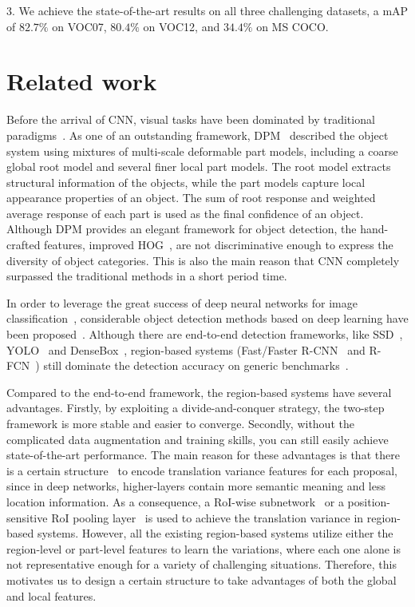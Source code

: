 \documentclass[10pt,twocolumn,letterpaper]{article}
\begin{document}
3. We achieve the state-of-the-art results on all three challenging datasets, \ie a mAP of $82.7\%$ on VOC07, $80.4\%$ on VOC12, and $34.4\%$ on MS COCO.

\section{Related work}
Before the arrival of CNN, visual tasks have been dominated by traditional paradigms~\cite{dollar2014fast, felzenszwalb2010object, viola2004robust, wang2014bilayer, wang2008multimodal}. As one of an outstanding framework, DPM~\cite{felzenszwalb2010object} described the object system using mixtures of multi-scale deformable part models, including a coarse global root model and several finer local part models. The root model extracts structural information of the objects, while the part models capture local appearance properties of an object. The sum of root response and weighted average response of each part is used as the final confidence of an object. Although DPM provides an elegant framework for object detection, the hand-crafted features, \ie improved HOG~\cite{dalal2005histograms}, are not discriminative enough to express the diversity of object categories. This is also the main reason that CNN completely surpassed the traditional methods in a short period time.

In order to leverage the great success of deep neural networks for image classification~\cite{he2016deep, krizhevsky2012imagenet}, considerable object detection methods based on deep learning have been proposed~\cite{girshick2014rich, he2014spatial, liu2016ssd, redmon2016you, zhu2016scale}. Although there are end-to-end detection frameworks, like SSD~\cite{liu2016ssd}, YOLO~\cite{redmon2016you} and DenseBox~\cite{huang2015densebox}, region-based systems (\ie Fast/Faster R-CNN~\cite{girshick2015fast, ren2015faster} and R-FCN~\cite{li2016r}) still dominate the detection accuracy on generic benchmarks~\cite{everingham2010pascal, lin2014microsoft}.

Compared to the end-to-end framework, the region-based systems have several advantages. Firstly, by exploiting a divide-and-conquer strategy, the two-step framework is more stable and easier to converge. Secondly, without the complicated data augmentation and training skills, you can still easily achieve state-of-the-art performance. The main reason for these advantages is that there is a certain structure~\cite{girshick2015fast, li2016r, ren2015faster} to encode translation variance features for each proposal, since in deep networks, higher-layers contain more semantic meaning and less location information. As a consequence, a RoI-wise subnetwork~\cite{girshick2015fast, ren2015faster} or a position-sensitive RoI pooling layer~\cite{li2016r} is used to achieve the translation variance in region-based systems. However, all the existing region-based systems utilize either the region-level or part-level features to learn the variations, where each one alone is not representative enough for a variety of challenging situations. Therefore, this motivates us to design a certain structure to take advantages of both the global and local features.
\end{document}
